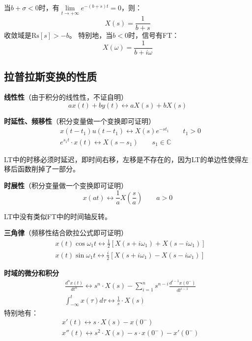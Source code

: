 当$b+\sigma <0$时，有$\underset{t\rightarrow +\infty}\lim e^{-\left( b+s \right) t}=0$，则：
\[
X\left( s \right) =\frac{1}{b+s}
\]
收敛域是$\mathrm{Rs}\left[ s \right] >-b$。
特别地，当$b<0$时，信号有FT：
\[
X\left( \omega \right) =\frac{1}{b+i\omega}
\]

\subsection{拉普拉斯变换的性质}

{\bf 线性性}（由于积分的线性性，不证自明）
\[
ax\left( t \right) +by\left( t \right) \leftrightarrow aX\left( s \right) +bX\left( s \right)
\]

{\bf 时延性、频移性}（积分变量做一个变换即可证明）
\begin{align*}
&x\left( t-t_1 \right) u\left( t-t_1 \right) \leftrightarrow X\left( s \right) e^{-st_1} \qquad t_1>0 \\
&e^{s_1t}\cdot x\left( t \right) \leftrightarrow X\left( s-s_1 \right) \qquad s_1\in \mathbb{C}
\end{align*}

LT中的时移必须时延迟，即时间右移，左移是不存在的，因为LT的单边性使得左移后函数削掉了一部分。

{\bf 时展性}（积分变量做一个变换即可证明）
\[
x\left( at \right) \leftrightarrow \frac{1}{a}X\left( \frac{s}{a} \right) \qquad a>0
\]

LT中没有类似FT中的时间轴反转。

{\bf 三角律}（频移性结合欧拉公式即可证明）
\begin{align*}
&x\left( t \right) \cos \omega _1t\leftrightarrow \frac{1}{2}\left[ X\left( s+i\omega _1 \right) +X\left( s-i\omega _1 \right) \right] \\
&x\left( t \right) \sin \omega _1t\leftrightarrow \frac{i}{2}\left[ X\left( s+i\omega _1 \right) -X\left( s-i\omega _1 \right) \right]
\end{align*}

{\bf 时域的微分和积分}
\begin{align*}
&\frac{d^nx\left( t \right)}{dt^n}\leftrightarrow s^n\cdot X\left( s \right) -\sum_{i=1}^n{s^{n-i}\frac{d^{i-1}x\left( 0^- \right)}{dt^{i-1}}} \\
&\int_{-\infty}^t{x\left( \tau \right) d\tau}\leftrightarrow \frac{1}{s}\cdot X\left( s \right)
\end{align*}
特别地有：
\begin{align*}
&x'\left( t \right) \leftrightarrow s\cdot X\left( s \right) -x\left( 0^- \right) \\
&x''\left( t \right) \leftrightarrow s^2\cdot X\left( s \right) -s\cdot x\left( 0^- \right) -x'\left( 0^- \right)
\end{align*}

